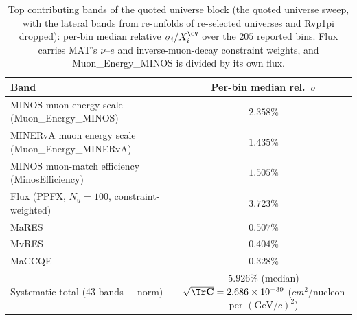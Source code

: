 \begin{table}[!htbp]
\centering
\caption[Top contributing bands of the quoted universe block]{Top contributing bands of the quoted universe block (the quoted universe sweep, with the lateral bands from re-unfolds of re-selected universes and Rvp1pi dropped): per-bin median relative $\sigma_{i}/X^{\CV}_{i}$ over the $205$ reported bins. Flux carries MAT's $\nu$--$e$ and inverse-muon-decay constraint weights, and Muon\_Energy\_MINOS is divided by its own flux.}
\label{tab:band-medians}
\begin{tabular}{@{}lc@{}}
\toprule
Band & Per-bin median rel.\ $\sigma$ \\
\midrule
MINOS muon energy scale (Muon\_Energy\_MINOS) & $2.358\%$ \\
MINERvA muon energy scale (Muon\_Energy\_MINERvA) & $1.435\%$ \\
MINOS muon-match efficiency (MinosEfficiency) & $1.505\%$ \\
Flux (PPFX, $N_{u}=100$, constraint-weighted) & $3.723\%$ \\ %
MaRES & $0.507\%$ \\ %
MvRES & $0.404\%$ \\ %
MaCCQE & $0.328\%$ \\ %
\midrule
\shortstack[l]{Systematic total\\(43 bands $+$ norm)} & \shortstack[l]{$\boxed{5.926\%}$ (median)\\$\sqrt{\Tr\mathbf{C}}=2.686\times10^{-39}$\\($\si{cm^2}$/nucleon per $(\mathrm{GeV}/c)^{2}$)} \\ %
\bottomrule
\end{tabular}
\end{table}

